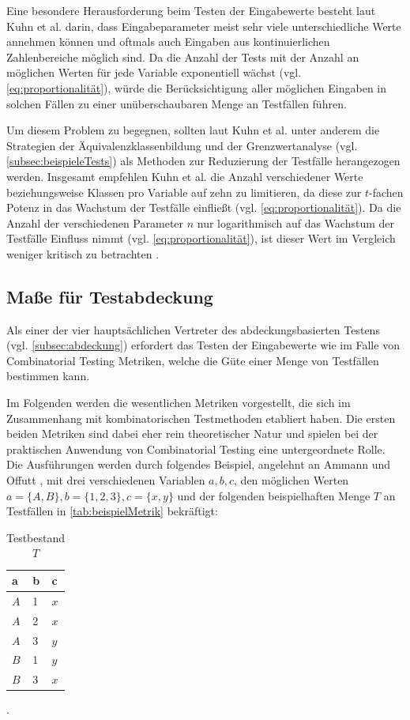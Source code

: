 Eine besondere Herausforderung beim Testen der Eingabewerte besteht laut Kuhn et al. \cite{kuhn2010practical} darin, dass Eingabeparameter meist sehr viele unterschiedliche Werte annehmen können und oftmals auch Eingaben aus kontinuierlichen Zahlenbereiche möglich sind. Da die Anzahl der Tests mit der Anzahl an möglichen Werten für jede Variable exponentiell wächst (vgl. \autoref{eq:proportionalität}), würde die Berücksichtigung aller möglichen Eingaben in solchen Fällen zu einer unüberschaubaren Menge an Testfällen führen. 

Um diesem Problem zu begegnen, sollten laut Kuhn et al. \cite{kuhn2010practical} unter anderem die Strategien der Äquivalenzklassenbildung und der Grenzwertanalyse (vgl. \autoref{subsec:beispieleTests}) als Methoden zur Reduzierung der Testfälle herangezogen werden. Insgesamt empfehlen Kuhn et al. \cite{kuhn2010practical} die Anzahl verschiedener Werte beziehungsweise Klassen pro Variable auf zehn zu limitieren, da diese zur $t$-fachen Potenz in das Wachstum der Testfälle einfließt (vgl. \autoref{eq:proportionalität}). Da die Anzahl der verschiedenen Parameter $n$ nur logarithmisch auf das Wachstum der Testfälle Einfluss nimmt (vgl. \autoref{eq:proportionalität}), ist dieser Wert im Vergleich weniger kritisch zu betrachten \cite{kuhn2010practical}.

\subsection{Maße für Testabdeckung}\label{subsec:masse}

Als einer der vier hauptsächlichen Vertreter des abdeckungsbasierten Testens (vgl. \autoref{subsec:abdeckung}) erfordert das Testen der Eingabewerte wie im Falle von Combinatorial Testing Metriken, welche die Güte einer Menge von Testfällen bestimmen kann.

Im Folgenden werden die wesentlichen Metriken vorgestellt, die sich im Zusammenhang mit kombinatorischen Testmethoden etabliert haben. Die ersten beiden Metriken sind dabei eher rein theoretischer Natur und spielen bei der praktischen Anwendung von Combinatorial Testing eine untergeordnete Rolle. Die Ausführungen werden durch folgendes Beispiel, angelehnt an Ammann und Offutt \cite[S. 160 ff.]{ammann2008introduction}, mit drei verschiedenen Variablen $a,b,c$, den möglichen Werten $a = \{A,B\}, b = \{1,2,3\}, c = \{x,y\}$ und der folgenden beispielhaften Menge $T$ an Testfällen in \autoref{tab:beispielMetrik} bekräftigt:
\begin{table}[h!]
\begin{tabular}{|l|l|l|}
\cellcolor{grauinfo}a   & \cellcolor{grauinfo}b & \cellcolor{grauinfo}c   \\ \hline
$A$ & 1 & $x$ \\ \hline
$A$ & 2 & $x$ \\ \hline
$A$ & 3 & $y$ \\ \hline
$B$ & 1 & $y$ \\ \hline
$B$ & 3 & $x$ \\ \hline
\end{tabular}
\caption{Testbestand $T$}.
\label{tab:beispielMetrik}
\end{table}
 
